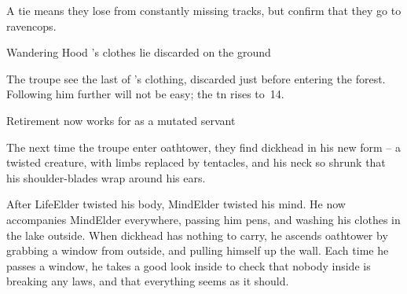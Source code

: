 \begin{multicols}{2}
A tie means they lose  from constantly missing tracks, but confirm that they go to \gls{ravencops}.

{Wandering Hood}%
{'s clothes lie discarded on the ground}%

The troupe see the last of 's clothing, discarded just before entering the forest.
Following him further will not be easy; the \gls{tn} rises to~14.

{Retirement}%
{ now works for  as a mutated servant}%

The next time the troupe enter \gls{oathtower}, they find \gls{dickhead} in his new form -- a twisted creature, with limbs replaced by tentacles, and his neck so shrunk that his shoulder-blades wrap around his ears.

After \gls{LifeElder} twisted his body, \gls{MindElder} twisted his mind.
He now accompanies \gls{MindElder} everywhere, passing him pens, and washing his clothes in the lake outside.
When \gls{dickhead} has nothing to carry, he ascends \gls{oathtower} by grabbing a window from outside, and pulling himself up the wall.
Each time he passes a window, he takes a good look inside to check that nobody inside is breaking any laws, and that everything seems as it should.


\dickheadReborn


\end{multicols}
